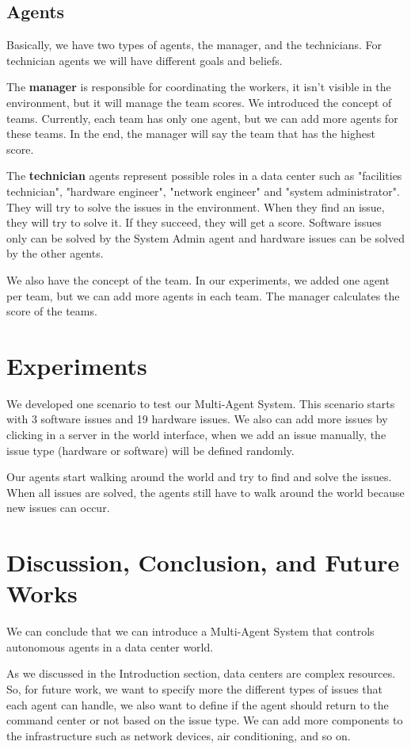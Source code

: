 \documentclass[letterpaper]{article}
\begin{document}
\subsection{Agents}

Basically, we have two types of agents, the manager, and the technicians. For technician agents we will have different goals and beliefs.

The \textbf{manager} is responsible for coordinating the workers, it isn't visible in the environment, but it will manage the team scores. We introduced the concept of teams. Currently, each team has only one agent, but we can add more agents for these teams. In the end, the manager will say the team that has the highest score.

The \textbf{technician} agents represent possible roles in a data center such as "facilities technician", "hardware engineer", "network engineer" and "system administrator". They will try to solve the issues in the environment. When they find an issue, they will try to solve it. If they succeed, they will get a score. Software issues only can be solved by the System Admin agent and hardware issues can be solved by the other agents.

We also have the concept of the team. In our experiments, we added one agent per team, but we can add more agents in each team. The manager calculates the score of the teams.

\section{Experiments}\label{sec:experiments}

We developed one scenario to test our Multi-Agent System. This scenario starts with 3 software issues and 19 hardware issues. We also can add more issues by clicking in a server in the world interface, when we add an issue manually, the issue type (hardware or software) will be defined randomly.

Our agents start walking around the world and try to find and solve the issues. When all issues are solved, the agents still have to walk around the world because new issues can occur.

\section{Discussion, Conclusion, and Future Works}\label{sec:conclusions}

We can conclude that we can introduce a Multi-Agent System that controls autonomous agents in a data center world.

As we discussed in the Introduction section, data centers are complex resources. So, for future work, we want to specify more the different types of issues that each agent can handle, we also want to define if the agent should return to the command center or not based on the issue type. We can add more components to the infrastructure such as network devices, air conditioning, and so on.



\end{document}
